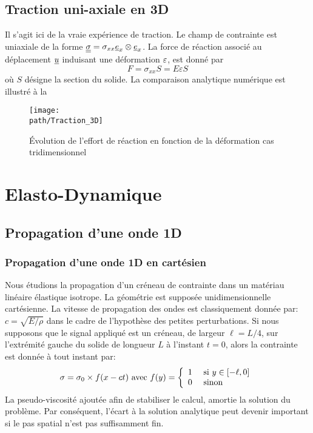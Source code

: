 \documentclass[10pt]{book}
\def\path{./fig}
\begin{document}
\subsection{Traction uni-axiale en 3D}
Il s'agit ici de la \og vraie \fg{} expérience de traction. Le champ de contrainte est uniaxiale de la forme $\underline{\underline{\sigma}} = {\sigma}_{xx}\underline{e}_{x}\otimes\underline{e}_{x}$. La force de réaction associé au déplacement $\underline{u}$ induisant une déformation ${\varepsilon}$, est donné par 
$$F = \sigma_{xx}S = E\varepsilon S$$
où $S$ désigne la section du solide. La comparaison analytique numérique est illustré à la 
\begin{figure}[!h]
\centering \texttt{[image: \\path/Traction\_3D]}
\caption{Évolution de l'effort de réaction en fonction de la déformation cas tridimensionnel}
\label{fig:compa_analytique_num_elast_3D}
\end{figure}
\FloatBarrier
\section{Elasto-Dynamique}
\subsection{Propagation d'une onde 1D}
\subsubsection{Propagation d'une onde 1D en cartésien}
Nous étudions la propagation d'un créneau de contrainte dans un matériau linéaire élastique isotrope. La géométrie est supposée unidimensionnelle cartésienne. La vitesse de propagation des ondes est classiquement donnée par:
$c=\sqrt{E/\rho}$ dans le cadre de l'hypothèse des petites perturbations. Si nous supposons que le signal appliqué est un créneau, de largeur $\ell=L/4$, sur l’extrémité gauche du solide de longueur $L$ à l'instant $t=0$, alors la contrainte est donnée à tout instant par:
$$\sigma = \sigma_{0}\times f(x-ct) \text{ avec } f(y)=\left\lbrace\begin{array}{ll}
1 & \text{ si } y\in[-\ell,0]\\
0 & \text{ sinon }
\end{array}\right.$$
La pseudo-viscosité ajoutée afin de stabiliser le calcul, amortie la solution du problème. Par conséquent, l’écart à la solution analytique peut devenir important si le pas spatial n'est pas suffisamment fin.
\end{document}
